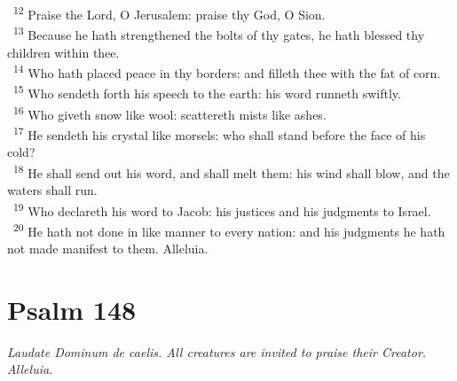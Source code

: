 \documentclass[a5paper,12pt]{article}
\begin{document}
\begin{multicols*}{2}
~\textsuperscript{12} Praise the Lord, O Jerusalem: praise thy God, O Sion.\\
~\textsuperscript{13} Because he hath strengthened the bolts of thy gates, he hath blessed thy children within thee.\\
~\textsuperscript{14} Who hath placed peace in thy borders: and filleth thee with the fat of corn.\\
~\textsuperscript{15} Who sendeth forth his speech to the earth: his word runneth swiftly.\\
~\textsuperscript{16} Who giveth snow like wool: scattereth mists like ashes.\\
~\textsuperscript{17} He sendeth his crystal like morsels: who shall stand before the face of his cold?\\
~\textsuperscript{18} He shall send out his word, and shall melt them: his wind shall blow, and the waters shall run.\\
~\textsuperscript{19} Who declareth his word to Jacob: his justices and his judgments to Israel.\\
~\textsuperscript{20} He hath not done in like manner to every nation: and his judgments he hath not made manifest to them. Alleluia.\\

\section{Psalm 148}
\label{sec:orge1c98dc}
\emph{Laudate Dominum de caelis. All creatures are invited to praise their Creator. Alleluia.}\\


\end{multicols*}
\end{document}
